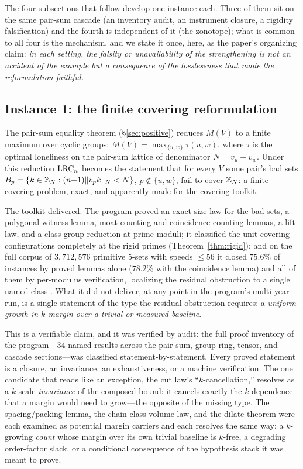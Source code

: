 The four subsections that follow develop one instance each. Three of
them sit on the same pair-sum cascade (an inventory audit, an instrument
closure, a rigidity falsification) and the fourth is independent of it
(the zonotope); what is common to all four is the mechanism, and we
state it once, here, as the paper's organizing claim: \emph{in each
setting, the falsity or unavailability of the strengthening is not an
accident of the example but a consequence of the losslessness that made
the reformulation faithful.}

\subsection{Instance 1: the finite covering reformulation}\label{sec:tm-covering}

The pair-sum equality theorem (\S\ref{sec:positive}) reduces
$M(V)$ to a finite maximum over cyclic groups: $M(V)=\max_{\{u,w\}}
\tau(u,w)$, where $\tau$ is the optimal loneliness on the pair-sum
lattice of denominator $N=v_u+v_w$. Under this reduction $\mathrm{LRC}_n$
becomes the statement that for every $V$ some pair's bad sets
$B_p=\{k\in\mathbb{Z}_N:(n{+}1)\lVert v_pk \rVert_{N}<N\}$, $p\notin\{u,w\}$, fail to
cover $\mathbb{Z}_N$: a finite covering problem, exact, and apparently made for
the covering toolkit.

The toolkit delivered. The program proved an exact size law for the bad
sets, a polygonal witness lemma, moat-counting and coincidence-counting
lemmas, a lift law, and a class-group reduction at prime moduli; it
classified the unit covering configurations completely at the rigid
primes (Theorem~\ref{thm:rigid}); and on the full corpus of
$3{,}712{,}576$ primitive $5$-sets with speeds $\le 56$ it closed
$75.6\%$ of instances by proved lemmas alone ($78.2\%$ with the
coincidence lemma) and all of them by per-modulus verification,
localizing the residual obstruction to a single named class
\cite{prog-artifacts}. What it did not deliver, at any point in the
program's multi-year run, is a single statement of the type the residual
obstruction requires: a \emph{uniform growth-in-$k$ margin over a trivial
or measured baseline}.

This is a verifiable claim, and it was verified by audit: the full proof
inventory of the program---$34$ named results across the pair-sum,
group-ring, tensor, and cascade sections---was classified
statement-by-statement. Every proved statement is a closure, an
invariance, an exhaustiveness, or a machine verification. The one
candidate that reads like an exception, the cut law's
``$k$-cancellation,'' resolves as a $k$-scale \emph{invariance} of the
composed bound: it cancels exactly the $k$-dependence that a margin
would need to grow---the opposite of the missing type. The
spacing/packing lemma, the chain-class volume law, and the dilate theorem
were each examined as potential margin carriers and each resolves the
same way: a $k$-growing \emph{count} whose margin over its own trivial
baseline is $k$-free, a degrading order-factor slack, or a conditional
consequence of the hypothesis stack it was meant to prove.


